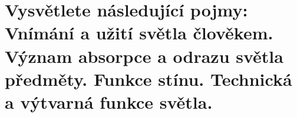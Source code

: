 \section{Vysvětlete následující pojmy: Vnímání a užití světla člověkem. Význam absorpce a odrazu světla předměty. 
Funkce stínu. Technická a výtvarná funkce světla.}